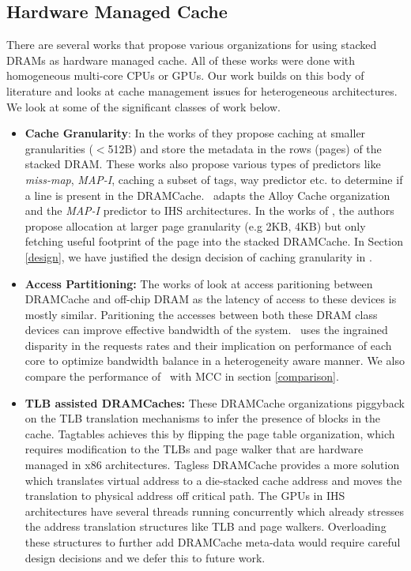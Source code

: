 \subsection{Hardware Managed Cache}
There are several works that propose various organizations for using stacked DRAMs as hardware managed cache. All of these works were done with homogeneous multi-core CPUs or GPUs. Our work builds on this body of literature and looks at cache management issues for heterogeneous architectures. We look at some of the significant classes of work below.
\begin{itemize}
\item \textbf{Cache Granularity}: In the works of \cite{loh-hill,alloy,atcache,bimodal} they propose caching at smaller granularities ($<$512B) and store the metadata in the rows (pages) of the stacked DRAM. These works also propose various types of predictors like \textit{miss-map}, \textit{MAP-I}, caching a subset of tags, way predictor etc. to determine if a line is present in the DRAMCache. \cachename\ adapts the Alloy Cache organization and the \textit{MAP-I} predictor to IHS architectures. In the works of \cite{footprint}, the authors propose allocation at larger page granularity (e.g 2KB, 4KB) but only fetching useful footprint of the page into the stacked DRAMCache. In Section \ref{design}, we have justified the design decision of caching granularity in \cachename.

\item \textbf{Access Partitioning:} The works of \cite{mostly-clean,mainak-hpca,micro-refresh,bear} look at access paritioning between DRAMCache and off-chip DRAM as the latency of access to these devices is mostly similar. Paritioning the accesses between both these DRAM class devices can improve effective bandwidth of the system. \cachename\ uses the ingrained disparity in the requests rates and their implication on performance of each core to optimize bandwidth balance in a heterogeneity aware manner. We also compare the performance of \cachename\ with MCC \cite{mostly-clean} in section \ref{comparison}.

\item \textbf{TLB assisted DRAMCaches:} These DRAMCache organizations piggyback on the TLB translation mechanisms to infer the presence of blocks in the cache. Tagtables \cite{tag-tables} achieves this by flipping the page table organization, which requires modification to the TLBs and page walker that are hardware managed in x86 architectures. Tagless DRAMCache \cite{tagless-dramcache} provides a more solution which translates virtual address to a die-stacked cache address and moves the translation to physical address off critical path. The GPUs in IHS architectures have several threads running concurrently which already stresses the address translation structures like TLB and page walkers. Overloading these structures to further add DRAMCache meta-data would require careful design decisions and we defer this to future work.

\end{itemize}
